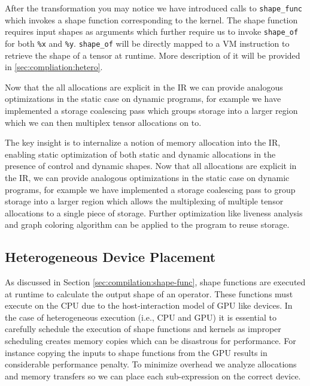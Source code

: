 After the transformation you may notice we have introduced calls to \verb|shape_func| which
  invokes a shape function corresponding to the kernel.
The shape function requires input shapes as arguments which further require us to invoke \verb|shape_of|
  for both \verb|%x| and \verb|%y|.
\verb|shape_of| will be directly mapped to a VM instruction to retrieve the shape of a tensor at runtime.
More description of it will be provided in \autoref{sec:compliation:hetero}.

Now that the all allocations are explicit in the IR we can provide analogous
  optimizations in the static case on dynamic programs,
  for example we have implemented a storage coalescing pass which groups storage
  into a larger region which we can then multiplex tensor allocations on to.

The key insight is to internalize a notion of memory allocation into the IR,
  enabling static optimization of both static and dynamic allocations in the presence
  of control and dynamic shapes.
Now that all allocations are explicit in the IR, we can provide analogous optimizations
  in the static case on dynamic programs, for example we have implemented a storage coalescing
  pass to group storage into a larger region which allows the multiplexing of multiple tensor
  allocations to a single piece of storage.
Further optimization like liveness analysis and graph coloring algorithm can be applied to
  the program to reuse storage.

\subsection{Heterogeneous Device Placement}
\label{sec:optimizations:hetero}

As discussed in Section \autoref{sec:compilation:shape-func}, shape functions are executed at runtime to
  calculate the output shape of an operator.
These functions must execute on the CPU due to the host-interaction model of GPU like devices.
In the case of heterogeneous execution (i.e., CPU and GPU) it is essential to carefully schedule
  the execution of shape functions and kernels as improper scheduling creates memory copies
  which can be disastrous for performance.
For instance copying the inputs to shape functions from the GPU results
  in considerable performance penalty.
To minimize overhead we analyze allocations and memory transfers so we can place
  each sub-expression on the correct device.

